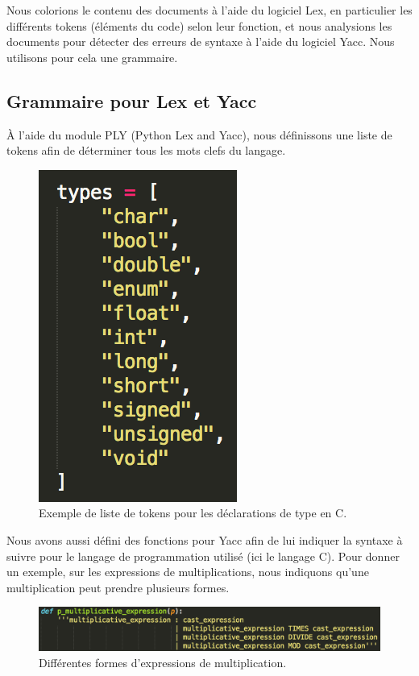 \documentclass[a4paper,12pt]{article}
\begin{document}
	Nous colorions le contenu des documents à l'aide du logiciel Lex, en particulier les différents tokens (éléments du code) selon leur fonction, et nous analysions les documents pour détecter des erreurs de syntaxe à l'aide du logiciel Yacc. Nous utilisons pour cela une grammaire.
	
	\subsection{Grammaire pour Lex et Yacc}
	
		À l'aide du module PLY (Python Lex and Yacc), nous définissons une liste de tokens afin de déterminer tous les mots clefs du langage.
		
		\begin{figure}[!h]
			\begin{center}
				\includegraphics[scale=0.6]{images/tokens}
				\caption{Exemple de liste de tokens pour les déclarations de type en C.}
			\end{center}
		\end{figure}
		
		\newpage
		
		Nous avons aussi défini des fonctions pour Yacc afin de lui indiquer la syntaxe à suivre pour le langage de programmation utilisé (ici le langage C).
		Pour donner un exemple, sur les expressions de multiplications, nous indiquons qu'une multiplication peut prendre plusieurs formes.
		
		\begin{figure}[!h]
			\begin{center}
				\includegraphics[scale=0.7]{images/yacc1}
				\caption{Différentes formes d'expressions de multiplication.}
			\end{center}
		\end{figure}
		
\end{document}
